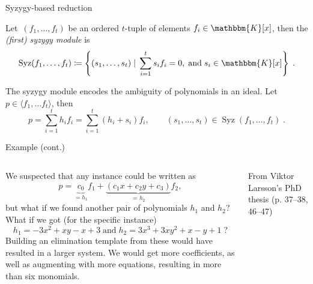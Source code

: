 \documentclass[aspectratio=169]{beamer}
\newcommand{\K}{\ensuremath{\mathbbm{K}}}
\DeclareMathOperator{\syz}{Syz}
\begin{document}
\begin{frame}{Syzygy-based reduction}
\begin{definition}
Let~$(f_1,\ldots,f_t)$ be an ordered $t$-tuple of elements
$f_i\in\K[x]$, then the \emph{(first) syzygy module} is
\begin{equation*}
\syz(f_1,\ldots,f_t) \coloneqq \left\{
    (s_1,\ldots,s_t)\;|\; \sum_{i=1}^t s_if_i=0, \;\mathrm{ and }\; s_i\in\K[x]
\right\}\;.
\end{equation*}
\end{definition}
The syzygy module encodes the ambiguity of polynomials in an ideal.
Let $p\in \langle f_1,\ldots f_t\rangle$, then
\begin{equation*}
    p = \sum_{i=1}^t h_if_i = \sum_{i=1}^t (h_i+s_i)f_i, \qquad (s_1,\ldots,s_t)\in\syz(f_1,\ldots,f_t)\;.
\end{equation*}
\end{frame}

\begin{frame}[t]{Example (cont.)}
\vspace{3mm}
\begin{columns}
    \begin{column}{0.7\textwidth}
        We suspected that any instance could be written as
        \begin{equation*}
            p = \underbrace{c_0}_{=h_1}f_1 + \underbrace{(c_1x+c_2y+c_3)}_{=h_2}f_2,
        \end{equation*}
        but what if we found another pair of polynomials $h_1$ and $h_2$? What if we got
        (for the specific instance)
        \[
            h_1=-3x^2+xy-x+3 \;\text{and}\; h_2 = 3x^3+3xy^2+x-y+1\;?
        \]
        Building an elimination template from these would have resulted in a larger system.
        We would get more coefficients, as well as augmenting with more equations, resulting in
        more than six monomials.
    \end{column}%
    \begin{column}{0.3\textwidth}
        \centering
        

        \vspace{5mm}

        {\scriptsize From Viktor Larsson's PhD thesis (p. 37--38, 46--47)}
    \end{column}
\end{columns}
\end{frame}
\end{document}
